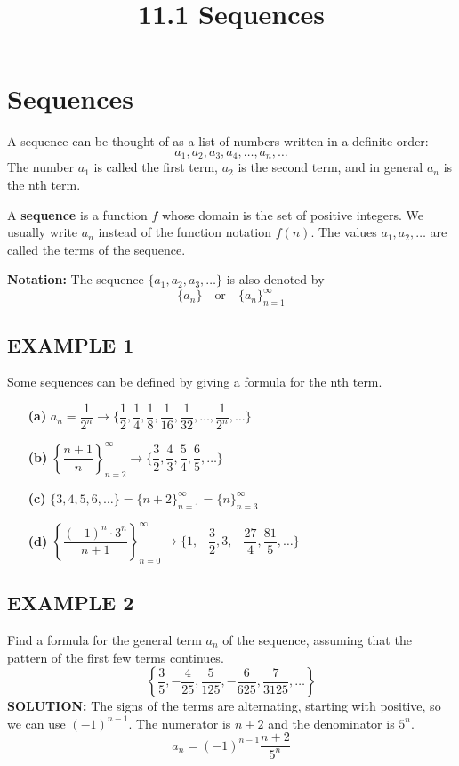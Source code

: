 \documentclass{article}
\title{11.1 Sequences}
\date{}
\author{}
\theoremstyle{mystyle}
\begin{document}
\maketitle

\section*{Sequences}
A sequence can be thought of as a list of numbers written in a definite order:
\[ a_1, a_2, a_3, a_4, \dots, a_n, \dots \]
The number \(a_1\) is called the first term, \(a_2\) is the second term, and in general \(a_n\) is the nth term.

\begin{tcolorbox}[colback=white, colframe=orange!80!white, title=Definition of a Sequence, boxrule=0.5mm, arc=3mm]
A \textbf{sequence} is a function \(f\) whose domain is the set of positive integers. We usually write \(a_n\) instead of the function notation \(f(n)\). The values \(a_1, a_2, \dots\) are called the terms of the sequence.
\end{tcolorbox}

\noindent
\textbf{Notation:} The sequence $\{a_1, a_2, a_3, \dots\}$ is also denoted by
\[ \{a_n\} \quad \text{or} \quad \{a_n\}_{n=1}^{\infty} \]

\subsection*{EXAMPLE 1}
Some sequences can be defined by giving a formula for the nth term.
\begin{itemize}
  \item[\bfseries(a)] \( a_n = \dfrac{1}{2^n} \rightarrow \{\dfrac{1}{2}, \dfrac{1}{4}, \dfrac{1}{8}, \dfrac{1}{16}, \dfrac{1}{32}, \dots, \dfrac{1}{2^n}, \dots\} \)
  \item[\bfseries(b)] \( \left\{ \dfrac{n+1}{n} \right\}_{n=2}^{\infty} \rightarrow \{\dfrac{3}{2}, \dfrac{4}{3}, \dfrac{5}{4}, \dfrac{6}{5}, \dots\} \)
  \item[\bfseries(c)] \( \{3, 4, 5, 6, \dots\} = \{n+2\}_{n=1}^{\infty} = \{n\}_{n=3}^{\infty} \)
  \item[\bfseries(d)] \( \left\{ \dfrac{(-1)^n \cdot 3^n}{n+1} \right\}_{n=0}^{\infty} \rightarrow \{1, -\dfrac{3}{2}, 3, -\dfrac{27}{4}, \dfrac{81}{5}, \dots\} \)
\end{itemize}

\subsection*{EXAMPLE 2}
Find a formula for the general term \(a_n\) of the sequence, assuming that the pattern of the first few terms continues.
\[ \left\{\dfrac{3}{5}, -\dfrac{4}{25}, \dfrac{5}{125}, -\dfrac{6}{625}, \dfrac{7}{3125}, \dots \right\} \]
\textbf{SOLUTION:} The signs of the terms are alternating, starting with positive, so we can use \( (-1)^{n-1} \). The numerator is \(n+2\) and the denominator is \(5^n\).
\[ a_n = (-1)^{n-1}\dfrac{n+2}{5^n} \]
\end{document}

